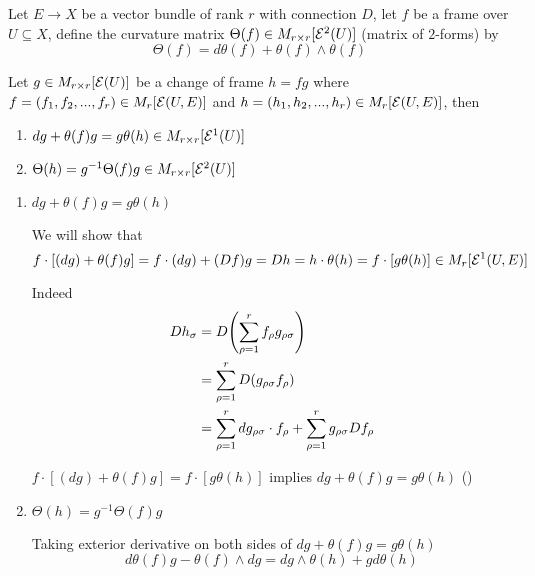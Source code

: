 \begin{definition}
	Let $E \to X$ be a vector bundle of rank $r$ with connection $D$, let $f$ be a frame over $U \subseteq X$, define the curvature matrix $\Theta(f) \in M_{r \times r}[\mathcal{E}^2(U)]$ (matrix of $2$-forms) by 
	$$
		\Theta(f) = d \theta(f) + \theta(f) \wedge \theta(f)
	$$
\end{definition}

\begin{lemma}
	Let $g \in M_{r \times r}[\mathcal{E}(U)]$ be a change of frame $h = fg$ where $f = (f_1, f_2, ..., f_r) \in M_r[\mathcal{E}(U, E)]$ and $h = (h_1, h_2, ..., h_r) \in M_r[\mathcal{E}(U, E)]$, then
	\begin{enumerate}
		\item $dg + \theta(f) g = g \theta(h) \in M_{r \times r}[\mathcal{E}^1(U)]$
		\item $\Theta(h) = g^{-1} \Theta(f) g \in M_{r \times r}[\mathcal{E}^2(U)]$
	\end{enumerate}
	\begin{longproof}
		\begin{enumerate}
			\item $dg + \theta(f) g = g \theta(h)$
				
				We will show that
				$$
					f \cdot [(dg) + \theta(f) g] = f \cdot (dg) + (Df) g = Dh = h \cdot \theta(h) = f \cdot [g \theta(h)] \in M_r[\mathcal{E}^1(U, E)]
				$$
				
				Indeed
				\begin{align*}
					Dh_\sigma
					&= D \tuple*{\sum_{\rho=1}^r f_\rho g_{\rho \sigma}} \\
					&= \sum_{\rho=1}^r D(g_{\rho \sigma} f_\rho) \\
					&= \sum_{\rho=1}^r dg_{\rho \sigma} \cdot f_\rho +\sum_{\rho=1}^r g_{\rho \sigma} D f_\rho \\
				\end{align*}
			
				$f \cdot [(dg) + \theta(f) g] = f \cdot [g \theta(h)]$ implies $dg + \theta(f) g = g \theta(h)$ ()

			\item $\Theta(h) = g^{-1} \Theta(f) g$
			
			Taking exterior derivative on both sides of $dg + \theta(f) g = g \theta(h)$ 
			$$
				d \theta(f) g - \theta(f) \wedge dg = dg \wedge \theta(h) + g d\theta(h)
			$$
			

\end{enumerate}
\end{longproof}
\end{lemma}
